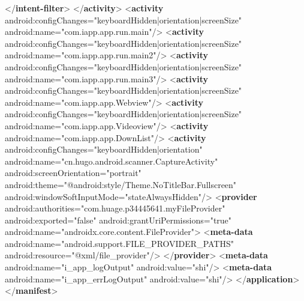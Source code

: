 \documentclass[
]{article}
\newenvironment{Shaded}{}{}
\newcommand{\KeywordTok}[1]{\textcolor[rgb]{0.00,0.44,0.13}{\textbf{#1}}}
\newcommand{\NormalTok}[1]{#1}
\newcommand{\OtherTok}[1]{\textcolor[rgb]{0.00,0.44,0.13}{#1}}
\newcommand{\StringTok}[1]{\textcolor[rgb]{0.25,0.44,0.63}{#1}}
\begin{document}
\begin{Shaded}
\begin{Highlighting}[]
\NormalTok{            \textless{}/}\KeywordTok{intent{-}filter}\NormalTok{\textgreater{}}
\NormalTok{        \textless{}/}\KeywordTok{activity}\NormalTok{\textgreater{}}
\NormalTok{        \textless{}}\KeywordTok{activity}\OtherTok{ android:configChanges=}\StringTok{"keyboardHidden|orientation|screenSize"}\OtherTok{ android:name=}\StringTok{"com.iapp.app.run.main"}\NormalTok{/\textgreater{}}
\NormalTok{        \textless{}}\KeywordTok{activity}\OtherTok{ android:configChanges=}\StringTok{"keyboardHidden|orientation|screenSize"}\OtherTok{ android:name=}\StringTok{"com.iapp.app.run.main2"}\NormalTok{/\textgreater{}}
\NormalTok{        \textless{}}\KeywordTok{activity}\OtherTok{ android:configChanges=}\StringTok{"keyboardHidden|orientation|screenSize"}\OtherTok{ android:name=}\StringTok{"com.iapp.app.run.main3"}\NormalTok{/\textgreater{}}
\NormalTok{        \textless{}}\KeywordTok{activity}\OtherTok{ android:configChanges=}\StringTok{"keyboardHidden|orientation|screenSize"}\OtherTok{ android:name=}\StringTok{"com.iapp.app.Webview"}\NormalTok{/\textgreater{}}
\NormalTok{        \textless{}}\KeywordTok{activity}\OtherTok{ android:configChanges=}\StringTok{"keyboardHidden|orientation|screenSize"}\OtherTok{ android:name=}\StringTok{"com.iapp.app.Videoview"}\NormalTok{/\textgreater{}}
\NormalTok{        \textless{}}\KeywordTok{activity}\OtherTok{ android:name=}\StringTok{"com.iapp.app.DownList"}\NormalTok{/\textgreater{}}
\NormalTok{        \textless{}}\KeywordTok{activity}\OtherTok{ android:configChanges=}\StringTok{"keyboardHidden|orientation"}\OtherTok{ android:name=}\StringTok{"cn.hugo.android.scanner.CaptureActivity"}\OtherTok{ android:screenOrientation=}\StringTok{"portrait"}\OtherTok{ android:theme=}\StringTok{"@android:style/Theme.NoTitleBar.Fullscreen"}\OtherTok{ android:windowSoftInputMode=}\StringTok{"stateAlwaysHidden"}\NormalTok{/\textgreater{}}
\NormalTok{        \textless{}}\KeywordTok{provider}\OtherTok{ android:authorities=}\StringTok{"com.huage.p34445641.myFileProvider"}\OtherTok{ android:exported=}\StringTok{"false"}\OtherTok{ android:grantUriPermissions=}\StringTok{"true"}\OtherTok{ android:name=}\StringTok{"androidx.core.content.FileProvider"}\NormalTok{\textgreater{}}
\NormalTok{            \textless{}}\KeywordTok{meta{-}data}\OtherTok{ android:name=}\StringTok{"android.support.FILE\_PROVIDER\_PATHS"}\OtherTok{ android:resource=}\StringTok{"@xml/file\_provider"}\NormalTok{/\textgreater{}}
\NormalTok{        \textless{}/}\KeywordTok{provider}\NormalTok{\textgreater{}}
\NormalTok{        \textless{}}\KeywordTok{meta{-}data}\OtherTok{ android:name=}\StringTok{"i\_app\_logOutput"}\OtherTok{ android:value=}\StringTok{"shi"}\NormalTok{/\textgreater{}}
\NormalTok{        \textless{}}\KeywordTok{meta{-}data}\OtherTok{ android:name=}\StringTok{"i\_app\_errLogOutput"}\OtherTok{ android:value=}\StringTok{"shi"}\NormalTok{/\textgreater{}}
\NormalTok{    \textless{}/}\KeywordTok{application}\NormalTok{\textgreater{}}
\NormalTok{\textless{}/}\KeywordTok{manifest}\NormalTok{\textgreater{}}
\end{Highlighting}
\end{Shaded}
\end{document}
